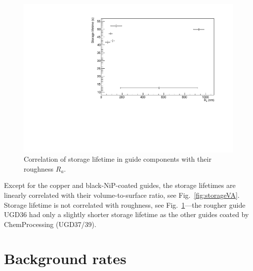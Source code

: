 \documentclass[10pt,letterpaper]{article}
\begin{document}
\begin{figure}
\centering
\includegraphics[width=\textwidth,page=1]{../storagelifetime_with_monitor/roughness.pdf}
\caption{Correlation of storage lifetime in guide components with their roughness $R_a$.}
\label{fig:storageroughness}
\end{figure}

Except for the copper and black-NiP-coated guides, the storage lifetimes are linearly correlated with their volume-to-surface ratio, see Fig.~\ref{fig:storageVA}. Storage lifetime is not correlated with roughness, see Fig.~\ref{fig:storageroughness}---the rougher guide UGD36 had only a slightly shorter storage lifetime as the other guides coated by ChemProcessing (UGD37/39).


\section{Background rates}
\label{sec:background}
\end{document}
